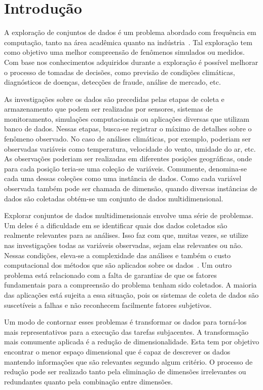 \chapter{Introdução}

A exploração de conjuntos de dados é um problema abordado
com frequência em computação, tanto na área acadêmica quanto
na indústria~\cite{Ngai2009,Harding2006}. Tal exploração tem
como objetivo uma melhor compreensão de fenômenos simulados
ou medidos. Com base nos conhecimentos adquiridos durante a
exploração é possível melhorar o processo de tomadas de
decisões, como previsão de condições climáticas,
diagnósticos de doenças, detecções de fraude, análise de
mercado, etc.

As investigações sobre os dados são precedidas pelas etapas
de coleta e armazenamento que podem ser realizadas por
sensores, sistemas de monitoramento, simulações
computacionais ou aplicações diversas que utilizam banco de
dados. Nessas etapas, busca-se registrar o máximo de
detalhes sobre o fenômeno observado. No caso de análises
climáticas, por exemplo, poderiam ser observadas variáveis
como temperatura, velocidade do vento, umidade do ar, etc.
As observações poderiam ser realizadas em diferentes
posições geográficas, onde para cada posição teria-se uma
coleção de variáveis. Comumente, denomina-se cada uma dessas
coleções como uma instância de dados.  Como cada variável
observada também pode ser chamada de dimensão, quando
diversas instâncias de dados são coletadas obtém-se um
conjunto de dados multidimensional. 

Explorar conjuntos de dados multidimensionais envolve uma
série de problemas. Um deles é a dificuldade em se
identificar quais dos dados coletados são realmente
relevantes para as análises. Isso faz com que, muitas vezes,
se utilize nas investigações todas as variáveis observadas,
sejam elas relevantes ou não. Nessas condições, eleva-se a
complexidade das análises e também o custo computacional dos
métodos que são aplicados sobre os dados~\cite{Beyer1999}.
Um outro problema está relacionado com a falta de garantias
de que os fatores fundamentais para a compreensão do
problema tenham sido coletados. A maioria das aplicações
está sujeita a essa situação, pois os sistemas de coleta de
dados são suscetíveis a falhas e não reconhecem facilmente
fatores subjetivos. 

Um modo de contornar esses problemas é transformar os dados
para torná-los mais representativos para a execução das
tarefas subjacentes. A transformação mais comumente aplicada
é a redução de dimensionalidade. Esta tem
por objetivo encontrar o menor espaço dimensional que é
capaz de descrever os dados mantendo informações que são
relevantes segundo algum critério. O processo de redução
pode ser realizado tanto pela eliminação de dimensões
irrelevantes ou redundantes quanto pela combinação entre
dimensões. 


